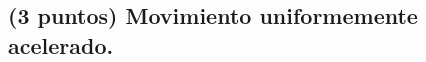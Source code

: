 \documentclass[12pt, letter]{exam}
\begin{document}
\begin{questions}

    \section{(3 puntos) Movimiento uniformemente acelerado.}
    

\end{questions}
\end{document}
